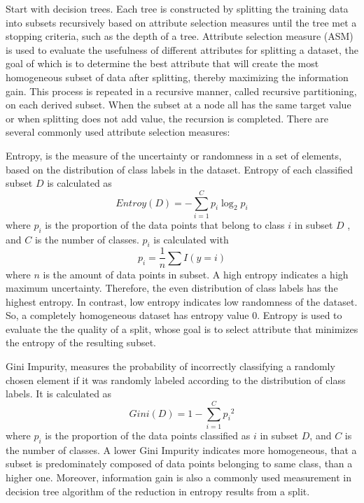 \documentclass[12pt,a4paper,english
]{tunithesis}
\begin{document}
Start with decision trees. Each tree is constructed by splitting the training data into subsets recursively based on attribute selection measures until the tree met a stopping criteria, such as the depth of a tree. Attribute selection measure (ASM) is used to evaluate the usefulness of different attributes for splitting a dataset, the goal of which is to determine the best attribute that will create the most homogeneous subset of data after splitting, thereby maximizing the information gain. This process is repeated in a recursive manner, called recursive partitioning, on each derived subset. When the subset at a node all has the same target value or when splitting does not add value, the recursion is completed. There are several commonly used attribute selection measures:

Entropy, is the measure of the uncertainty or randomness in a set of elements, based on the distribution of class labels in the dataset. Entropy of each classified subset ${D}$ is calculated as
\begin{equation}
    Entroy(D)=-\sum_{i = 1}^C {p_i} \log _2 {p_i}
\end{equation}
where ${p_i}$ is the proportion of the data points that belong to class ${i}$ in subset ${D}$ , and ${C}$ is the number of classes. ${p_i}$ is calculated with
\begin{equation}
    p_i = \frac{1}{n} \sum I(y=i)
\end{equation}
where ${n}$ is the amount of data points in subset.
A high entropy indicates a high maximum uncertainty. Therefore, the even distribution of class labels has the highest entropy. In contrast, low entropy indicates low randomness of the dataset. So, a completely homogeneous dataset has entropy value 0. Entropy is used to evaluate the the quality of a split, whose goal is to select attribute that minimizes the entropy of the resulting subset.

Gini Impurity, measures the probability of incorrectly classifying a randomly chosen element if it was randomly labeled according to the distribution of class labels. It is calculated as 
\begin{equation}
    Gini(D) = 1-\sum_{i=1}^C {p_i}^2
\end{equation}
where ${p_i}$ is the proportion of the data points classified as ${i}$ in subset ${D}$, and ${C}$ is the number of classes. A lower Gini Impurity indicates more homogeneous, that a subset is predominately composed of data points belonging to same class, than a higher one. Moreover, information gain is also a commonly used measurement in decision tree algorithm of the reduction in entropy results from a split.
\end{document}
